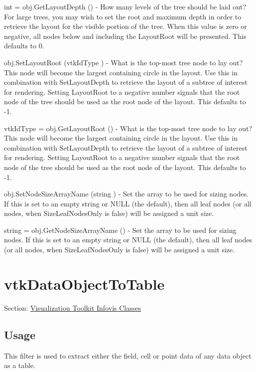 \begin{DoxyItemize}
\item {\ttfamily int = obj.\-Get\-Layout\-Depth ()} -\/ How many levels of the tree should be laid out? For large trees, you may wish to set the root and maximum depth in order to retrieve the layout for the visible portion of the tree. When this value is zero or negative, all nodes below and including the Layout\-Root will be presented. This defaults to 0.  
\item {\ttfamily obj.\-Set\-Layout\-Root (vtk\-Id\-Type )} -\/ What is the top-\/most tree node to lay out? This node will become the largest containing circle in the layout. Use this in combination with Set\-Layout\-Depth to retrieve the layout of a subtree of interest for rendering. Setting Layout\-Root to a negative number signals that the root node of the tree should be used as the root node of the layout. This defaults to -\/1.  
\item {\ttfamily vtk\-Id\-Type = obj.\-Get\-Layout\-Root ()} -\/ What is the top-\/most tree node to lay out? This node will become the largest containing circle in the layout. Use this in combination with Set\-Layout\-Depth to retrieve the layout of a subtree of interest for rendering. Setting Layout\-Root to a negative number signals that the root node of the tree should be used as the root node of the layout. This defaults to -\/1.  
\item {\ttfamily obj.\-Set\-Node\-Size\-Array\-Name (string )} -\/ Set the array to be used for sizing nodes. If this is set to an empty string or N\-U\-L\-L (the default), then all leaf nodes (or all nodes, when Size\-Leaf\-Nodes\-Only is false) will be assigned a unit size.  
\item {\ttfamily string = obj.\-Get\-Node\-Size\-Array\-Name ()} -\/ Set the array to be used for sizing nodes. If this is set to an empty string or N\-U\-L\-L (the default), then all leaf nodes (or all nodes, when Size\-Leaf\-Nodes\-Only is false) will be assigned a unit size.  
\end{DoxyItemize}\hypertarget{vtkinfovis_vtkdataobjecttotable}{}\section{vtk\-Data\-Object\-To\-Table}\label{vtkinfovis_vtkdataobjecttotable}
Section\-: \hyperlink{sec_vtkinfovis}{Visualization Toolkit Infovis Classes} \hypertarget{vtkwidgets_vtkxyplotwidget_Usage}{}\subsection{Usage}\label{vtkwidgets_vtkxyplotwidget_Usage}
This filter is used to extract either the field, cell or point data of any data object as a table.

